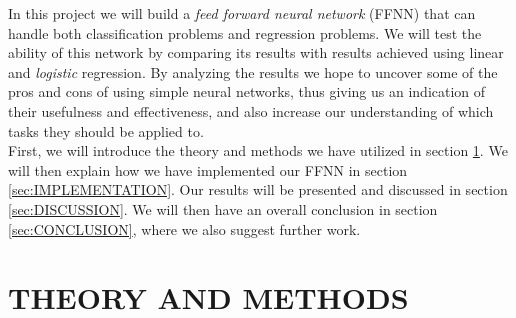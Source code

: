 \documentclass[english,notitlepage,reprint,nofootinbib]{revtex4-1}  %
\begin{document}
In this project we will build a \textit{feed forward neural network} (FFNN) that can handle both classification problems and regression problems. We will test the ability of this network by comparing its results with results achieved using linear and \textit{logistic} regression. By analyzing the results we hope to uncover some of the pros and cons of using simple neural networks, thus giving us an indication of their usefulness and effectiveness, and also increase our understanding of which tasks they should be applied to.  
\\

First, we will introduce the theory and methods we have utilized in section \ref{sec:METHODS}. We will then explain how we have implemented our FFNN in section \ref{sec:IMPLEMENTATION}. Our results will be presented and discussed in section \ref{sec:DISCUSSION}. We will then have an overall conclusion in section \ref{sec:CONCLUSION}, where we also suggest further work.
\section{THEORY AND METHODS}
\label{sec:METHODS}
\end{document}

